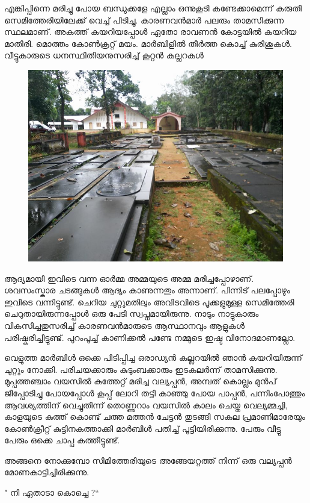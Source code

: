 \documentclass[10pt,a4paper]{report}
\begin{document}
   എങ്കിപ്പിന്നെ മരിച്ചു പോയ ബന്ധുക്കളേ എല്ലാം ഒന്നുകൂടി കണ്ടേക്കാമെന്ന് കരുതി സെമിത്തേരിയിലേക്ക് വെച്ച് പിടിച്ചു. കാരണവൻമാർ പലരും താമസിക്കുന്ന സ്ഥലമാണ്. അകത്ത് കയറിയപ്പോൾ ഏതോ രാവണൻ കോട്ടയിൽ കയറിയ മാതിരി. മൊത്തം കോൺക്രറ്റ് മയം. മാർബിളിൽ തീർത്ത കൊച്ച് കുരിശുകൾ. വീട്ടുകാരുടെ ധനസ്ഥിതിയനുസരിച്ച് കൂറ്റൻ കല്ലറകൾ 
       \begin{figure}[H]
  \center
\includegraphics[scale=.25]{images/semitry} 
\label{sem3}
\caption{  }
\end{figure}
   ആദ്യമായി ഇവിടെ വന്ന ഓർമ്മ അമ്മയുടെ അമ്മ മരിച്ചപ്പോഴാണ്. ശവസംസ്കാര ചടങ്ങുകൾ ആദ്യം കാണുന്നതും അന്നാണ്. പിന്നിട് പലപ്പോഴും ഇവിടെ വന്നിട്ടുണ്ട്. ചെറിയ ചുറ്റുമതിലും അവിടവിടെ പൂക്കളുമുള്ള സെമിത്തേരി ചെറുതായിരുന്നപ്പോൾ ഒരു പേടി സ്വപ്നമായിരുന്നു. നാടും നാട്ടുകാരും വികസിച്ചതുസരിച്ച് കാരണവൻമാരുടെ ആസ്ഥാനവും ആളുകൾ പരിഷ്കരിച്ചിട്ടുണ്ട്. പുറംപൂച്ച് കാണിക്കൽ പണ്ടേ നമ്മുടെ ഇഷ്ട വിനോദമാണല്ലോ.
   
    വെളുത്ത മാർബിൾ ഒക്കെ പിടിപ്പിച്ച ഒരാഡ്യൻ കല്ലറയിൽ ഞാൻ കയറിയിരുന്ന് ചുറ്റും നോക്കി. പരിചയക്കാരും കുടുംബക്കാരും ഇടകലർന്ന് താമസിക്കുന്നു. മുപ്പത്തഞ്ചാം വയസിൽ കുത്തേറ്റ് മരിച്ച വല്യപ്പൻ, അമ്പത് കൊല്ലം മുൻപ് ജീപ്പോടിച്ചു പോയപ്പോൾ കൂപ്പ് ലോറി തട്ടി കാഞ്ഞു പോയ പാപ്പൻ, പന്നിംപോത്തും ആവശ്യത്തിന് വെച്ചുതിന്ന് തൊണ്ണുറാം വയസിൽ കാലം ചെയ്ത വെല്യമ്മച്ചി, കാളയുടെ കുത്ത് കൊണ്ട് ചത്ത മത്തൻ ചേട്ടൻ തുടങ്ങി സകല പ്രമാണിമാരേയും കോൺക്രീറ്റ് കുട്ടിനകത്താക്കി മാർബിൾ പതിച്ച് പൂട്ടിയിരിക്കുന്നു. പേരും വീട്ടു പേരും ഒക്കെ ചാപ്പ കത്തീട്ടുണ്ട്. 
    
    അങ്ങനെ നോക്കുമ്പോ സിമിത്തേരിയുടെ അങ്ങേയറ്റത്ത് നിന്ന് ഒരു വല്യപ്പൻ മോണകാട്ടിച്ചിരിക്കുന്നു.
    
    " നി ഏതാടാ കൊച്ചെ ?“ 
    
\end{document}
